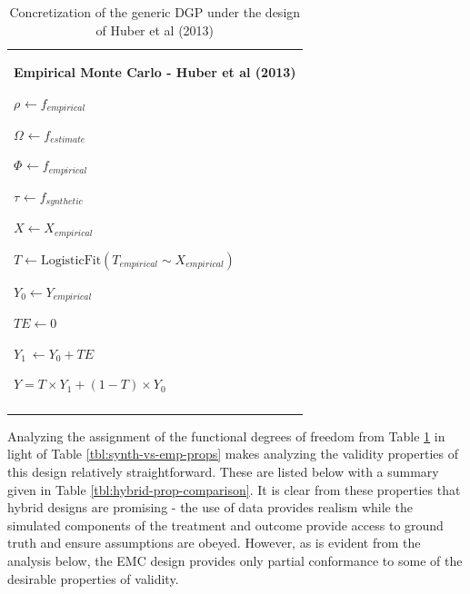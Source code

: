 \documentclass[../main.tex]{subfiles}
\begin{document}
\begin{table}[H]
 			\centering
\begin{tabular}{p{3.14in}}
\hline
\multicolumn{1}{|p{3.14in}|}{\textbf{Empirical Monte Carlo - Huber et al (2013)} \par  \(  \rho _{} \leftarrow f_{empirical}~ \)  \par  \(  \Omega _{} \leftarrow f_{estimate} \)  \par  \(  \Phi _{} \leftarrow f_{empirical} \)  \par  \(  \tau_{} \leftarrow f_{synthetic}~ \)  \par  \( X \leftarrow X_{empirical} \)  \par  \( T \leftarrow \text{LogisticFit} \left(  T_{empirical} \sim X_{empirical} \right)  \)  \par  \( Y_{0} \leftarrow Y_{empirical} \)  \par  \( TE \leftarrow 0 \)  \par  \( Y_{1}~ \leftarrow Y_{0}+ TE \)  \par  \( Y = T \times Y_{1}+  \left( 1-T \right)  \times Y_{0} \)  \par } \\
\hhline{-}

\end{tabular}
\caption{Concretization of the generic DGP under the design of Huber et al (2013)}
\label{tbl:huber-hybrid}
\end{table}


\vspace{\baselineskip}
Analyzing the assignment of the functional degrees of freedom from Table \ref{tbl:huber-hybrid} in light of Table \ref{tbl:synth-vs-emp-props} makes analyzing the validity properties of this design relatively straightforward. These are listed below with a summary given in Table \ref{tbl:hybrid-prop-comparison}. It is clear from these properties that hybrid designs are promising - the use of data provides realism while the simulated components of the treatment and outcome provide access to ground truth and ensure assumptions are obeyed. However, as is evident from the analysis below, the EMC design provides only partial conformance to some of the desirable properties of validity.\par
\end{document}
